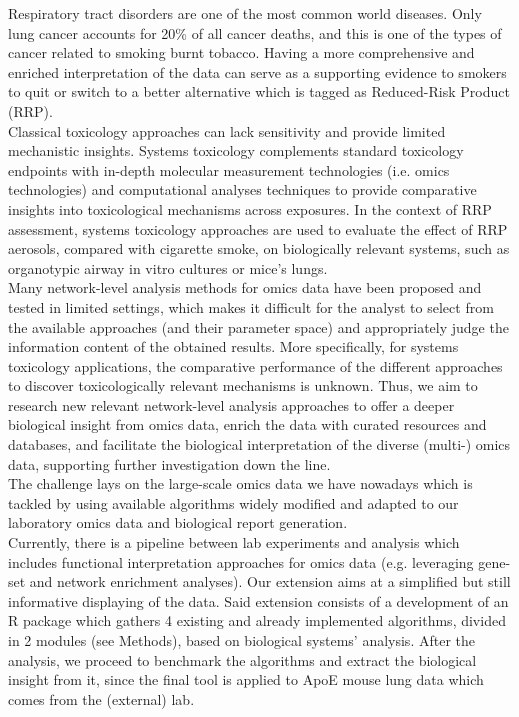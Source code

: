 Respiratory tract disorders are one of the most common world diseases. Only lung cancer accounts for 20\% of all cancer deaths, and this is one of the types of cancer related to smoking burnt tobacco. Having a more comprehensive and enriched interpretation of the data can serve as a supporting evidence to smokers to quit or switch to a better alternative which is tagged as Reduced-Risk Product (RRP). 
\\

Classical toxicology  approaches can lack sensitivity and provide limited mechanistic insights. Systems toxicology \cite{Sturla2014SystemsAssessment} complements standard toxicology endpoints with in-depth molecular measurement technologies (i.e. omics technologies) and computational analyses techniques to provide comparative insights into toxicological mechanisms across exposures. In the context of RRP assessment, systems toxicology approaches are used to evaluate the effect of RRP aerosols, compared with cigarette smoke, on biologically relevant systems, such as organotypic airway in vitro cultures or mice’s lungs.
\\

Many network-level analysis methods for omics data have been proposed and tested in limited settings, which makes it difficult for the analyst to select from the available approaches (and their parameter space) and appropriately judge the information content of the obtained results. More specifically, for systems toxicology applications, the comparative performance of the different approaches to discover toxicologically relevant mechanisms is unknown. Thus, we aim to research new relevant network-level analysis approaches to offer a deeper biological insight from omics data, enrich the data with curated resources and databases, and facilitate the biological interpretation of the diverse (multi-) omics data, supporting further investigation down the line.
\\

The challenge lays on the large-scale omics data we have nowadays which is tackled by using available algorithms widely modified and adapted to our laboratory omics data and biological report generation. 
\\

Currently, there is a pipeline between lab experiments and analysis which includes functional interpretation approaches for omics data (e.g. leveraging gene-set and network enrichment analyses). Our extension aims at a simplified but still informative displaying of the data. Said extension consists of a development of an R package which gathers 4 existing and already implemented algorithms, divided in 2 modules (see Methods), based on biological systems’ analysis. After the analysis, we proceed to benchmark the algorithms and extract the biological insight from it, since the final tool is applied to ApoE mouse lung data which comes from the (external) lab.

